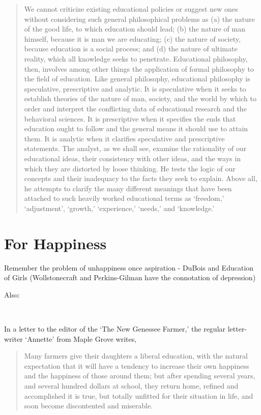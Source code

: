 \begin{quote}

We cannot criticize existing educational policies or suggest new ones without considering such general philosophical problems as (a) the nature of the good life, to which education should lead; (b) the nature of man himself, because it is man we are educating; (c) the nature of society, because education is a social process; and (d) the nature of ultimate reality, which all knowledge seeks to penetrate. Educational philosophy, then, involves among other things the application of formal philosophy to the field of education.
Like general philosophy, educational philosophy is speculative, prescriptive and analytic. It is speculative when it seeks to establish theories of the nature of man, society, and the world by which to order and interpret the conflicting data of educational research and the behavioral sciences. It is prescriptive when it specifies the ends that education ought to follow and the general means it should use to attain them. It is analytic when it clarifies speculative and prescriptive statements. The analyst, as we shall see, examine the rationality of our educational ideas, their consistency with other ideas, and the ways in which they are distorted by loose thinking. He tests the logic of our concepts and their inadequacy to the facts they seek to explain. Above all, he attempts to clarify the many different meanings that have been attached to such heavily worked educational terms as `freedom,' `adjustment', `growth,' `experience,' `needs,' and `knowledge.' ~\citep[p. 5]{Kneller:1971wq}
\end{quote}

\section{For Happiness}
\label{forhappiness}

Remember the problem of unhappiness once aspiration - DuBois and Education of Girls (Wollstonecraft and Perkins-Gilman have the connotation of depression)

Also: ~\citep{White:1990tq}

~\citep{Hamlyn:2009ev}

In a letter to the editor of the `The New Genessee Farmer,' the regular letter-writer `Annette' from Maple Grove writes,

\begin{quote}

Many farmers give their daughters a liberal education, with the natural expectation that it will have a tendency to increase their own happiness and the happiness of those around them; but after spending several years, and several hundred dollars at school, they return home, refined and accomplished it is true, but totally unfitted for their situation in life, and soon become discontented and miserable. ~\citep{Annette:1840vq}
\end{quote}

